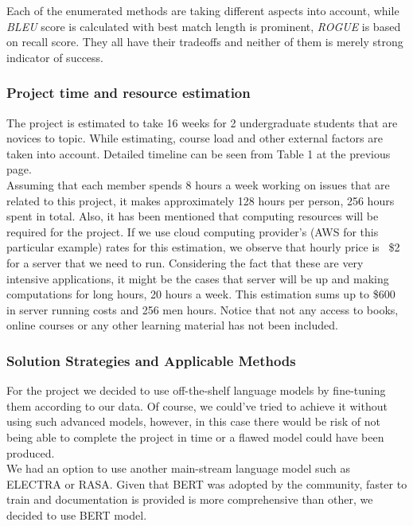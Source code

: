 \documentclass{mefsdp}
\begin{document}
	Each of the enumerated methods are taking different aspects into account, while \textit{BLEU} score is calculated with best match length is prominent, \textit{ROGUE} is based on recall score. They all have their tradeoffs and neither of them is merely strong indicator of success.
	
	\subsubsection{Project time and resource estimation}
	The project is estimated to take 16 weeks for 2 undergraduate students that are novices to topic. While estimating, course load and other external factors are taken into account. Detailed timeline can be seen from Table 1 at the previous page. \\
	
	Assuming that each member spends 8 hours a week working on issues that are related to this project, it makes approximately 128 hours per person, 256 hours spent in total. Also, it has been mentioned that computing resources will be required for the project. If we use cloud computing provider’s (AWS for this particular example) rates for this estimation, we observe that hourly price is ~\$2 for a server that we need to run. Considering the fact that these are very intensive applications, it might be the cases that server will be up and making computations for long hours, 20 hours a week. This estimation sums up to \$600 in server running costs and 256 men hours. Notice that not any access to books, online courses or any other learning material has not been included.
	
	
	\subsubsection{Solution Strategies and Applicable Methods}
	For the project we decided to use off-the-shelf language models by fine-tuning them according to our data. Of course, we could’ve tried to achieve it without using such advanced models, however, in this case there would be risk of not being able to complete the project in time or a flawed model could have been produced.\\
	
	We had an option to use another main-stream language model such as ELECTRA or RASA. Given that BERT was adopted by the community, faster to train and documentation is provided is more comprehensive than other, we decided to use BERT model.
	
	
\end{document}
